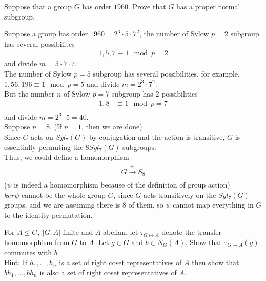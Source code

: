 \documentclass{article}
\begin{document}
\begin{homeworkProblem}
    Suppose that a group $G$ has order $1960$. Prove that $G$ has a proper normal subgroup.\\
    \solution

    Suppose a group has order $1960 = 2^3 \cdot 5 \cdot 7^2$, 
    the number of Sylow $p=2$ subgroup has several possibilites 
    \begin{align}
        1,5,7 \equiv 1 \mod p = 2
    \end{align}
    and divide $m = 5 \cdot 7 \cdot 7$.\\
    The number of Sylow $p=5$ subgroup has several possibilities, 
    for example, $1,56, 196 \equiv 1 \mod p = 5$
    and divide $m = 2^3 \cdot 7^2$.\\
    But the number $n$ of Sylow $p = 7$ subgroup has $2$ 
    possibilities 
    \begin{align}
        1,8 &\equiv 1 \mod p = 7\\
    \end{align}
    and divide $m = 2^3 \cdot 5 = 40$.\\
    Suppose $n = 8$. (If $n=1$, then we are done)\\
    Since $G$ acts on $Syl_7 (G)$ by conjugation 
    and the action is transitive, $G$ is 
    essentially permuting the $8 Syl_7 (G)$ subgroups.\\
    Thus, we could define a homomorphism
    \begin{align}
        G \xrightarrow[]{\psi} S_8
    \end{align}
    ($\psi$ is indeed a homomorphism 
    because of the definition of group action)\\
    $ker \psi$ cannot be the whole group $G$, 
    since $G$ acts transitively on the 
    $Syl_7 (G)$ groups, and we are assuming 
    there is $8$ of them, 
    so $\psi$ cannot map everything in $G$ to the identity permutation.\\
    


    
\end{homeworkProblem}

\pagebreak

\begin{homeworkProblem}
For $A \leq G, \ \lvert G:A \rvert$ finite and $A$ abelian,
let $\tau_{G \mapsto A}$ denote the transfer 
homomorphism from $G$ to $A$. Let $g \in G$
and $b \in N_G(A)$. Show that 
$\tau_{G \mapsto A} (g)$ commutes with $b$.\\
Hint: If $ h_1, \ldots, h_{n} $ is a set of right coset representatives 
of $A$ then show that $ bh_1, \ldots, bh_n $ is also a set of right
coset representatives of $A$.

    
\end{homeworkProblem}

\pagebreak
\end{document}
